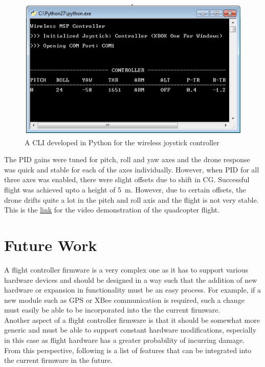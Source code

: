 \documentclass[a4paper,12pt,oneside]{book}
\begin{document}
{\begin{figure}[!htb]
\centering
\includegraphics[width=\textwidth]{images/xbox_cli}
\caption{A CLI developed in Python for the wireless joystick controller}
\label{fig:xbox_cli}
\end{figure}

\bigskip

The PID gains were tuned for pitch, roll and yaw axes and the drone response was quick and stable for each of the axes individually. However, when PID for all three axes was enabled, there were slight offsets due to shift in CG. Successful flight was achieved upto a height of \SI{5}{\m}. However, due to certain offsets, the drone drifts quite a lot in the pitch and roll axis and the flight is not very stable. This is the \href{https://youtu.be/p4aTLVsBq5Q}{link} for the video demonstration of the quadcopter flight.\\

\chapter[Future Work]{Future Work}
A flight controller firmware is a very complex one as it has to support various hardware devices and should be designed in a way such that the addition of new hardware or expansion in functionality must be an easy process. For example, if a new module such as GPS or XBee communication is required, such a change must easily be able to be incorporated into the the current firmware.\\

Another aspect of a flight controller firmware is that it should be somewhat more generic and must be able to support constant hardware modifications, especially in this case as flight hardware has a greater probability of incurring damage. From this perspective, following is a list of features that can be integrated into the current firmware in the future.\\

}
\end{document}
